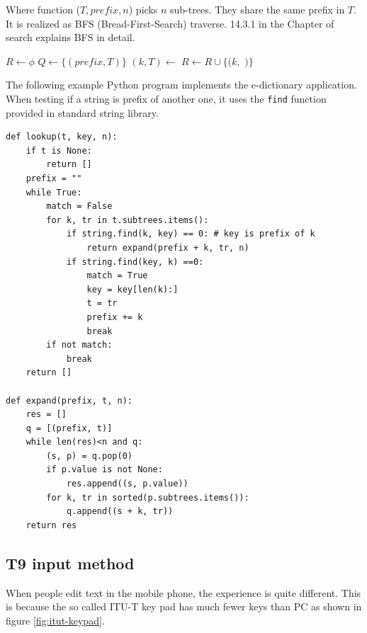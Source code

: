 \documentclass[b5paper]{article}
\begin{document}
Where function ($T, prefix, n$) picks $n$ sub-trees. They
share the same prefix in $T$. It is realized as BFS (Bread-First-Search) traverse. 14.3.1 in the Chapter of search explains BFS in detail.

\begin{algorithmic}[1]
  \State $R \gets \phi$
  \State $Q \gets \{(prefix, T)\}$
    \State $(k, T) \gets$ 
      \State $R \gets R \cup \{(k, $  $)\}$
    \EndIf
      \State {}
    \EndFor
  \EndWhile
\EndFunction
\end{algorithmic}

The following example Python program implements the e-dictionary application.
When testing if a string is prefix of another one, it uses the \texttt{find}
function provided in standard string library.

\lstset{language=Python}
\begin{lstlisting}
def lookup(t, key, n):
    if t is None:
        return []
    prefix = ""
    while True:
        match = False
        for k, tr in t.subtrees.items():
            if string.find(k, key) == 0: # key is prefix of k
                return expand(prefix + k, tr, n)
            if string.find(key, k) ==0:
                match = True
                key = key[len(k):]
                t = tr
                prefix += k
                break
        if not match:
            break
    return []

def expand(prefix, t, n):
    res = []
    q = [(prefix, t)]
    while len(res)<n and q:
        (s, p) = q.pop(0)
        if p.value is not None:
            res.append((s, p.value))
        for k, tr in sorted(p.subtrees.items()):
            q.append((s + k, tr))
    return res
\end{lstlisting}



\subsection{T9 input method}

When people edit text in the mobile phone, the experience is quite different.
This is because the so called ITU-T key pad has much fewer
keys than PC as shown in figure \ref{fig:itut-keypad}.
\end{document}

